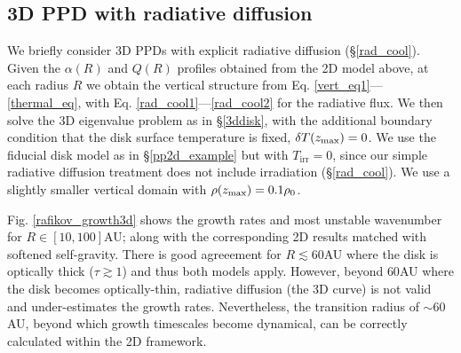 \subsection{3D PPD with radiative diffusion}
We briefly consider 3D PPDs with explicit radiative diffusion
(\S\ref{rad_cool}). 
Given the $\alpha(R)$ and $Q(R)$ profiles obtained
from the 2D model above, at each radius $R$ we obtain the vertical
structure from Eq. \ref{vert_eq1}---\ref{thermal_eq}, with 
Eq. \ref{rad_cool1}---\ref{rad_cool2} for the radiative flux.
We then solve the 3D eigenvalue problem as in \S\ref{3ddisk}, with the
additional boundary condition that the disk surface temperature is
fixed, $\delta T(z_\mathrm{max}) = 0$. 
We use the fiducial disk model as in \S\ref{pp2d_example} but 
with $T_\mathrm{irr}=0$, since our simple radiative diffusion
treatment does not include irradiation (\S\ref{rad_cool}). %
We use a slightly smaller vertical
domain with $\rho(z_\mathrm{max})=0.1\rho_0$.  %

Fig. \ref{rafikov_growth3d} shows the growth rates and most unstable 
wavenumber for $R\in[10,100]$AU; along with the corresponding 2D 
results matched with softened self-gravity. There is good agreeement for
$R\lesssim60$AU where the disk is optically thick ($\tau\gtrsim
1$) and thus both models apply. However, beyond $60$AU where the disk
becomes optically-thin, radiative diffusion (the 3D curve) is not
valid and under-estimates the growth rates. %
Nevertheless, the transition radius of  
$\sim60$AU, beyond which growth timescales become dynamical,    
can be correctly calculated within the 2D framework.  

